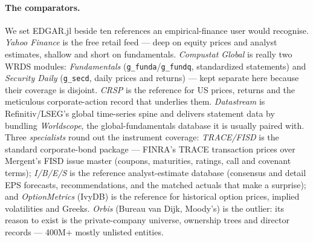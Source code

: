 \documentclass[11pt,a4paper]{report}
\begin{document}
\paragraph{The comparators.} We set EDGAR.jl beside ten references an empirical-finance user
would recognise. \emph{Yahoo Finance} is the free retail feed --- deep on equity prices and analyst
estimates, shallow and short on fundamentals. \emph{Compustat Global} is really two WRDS modules:
\emph{Fundamentals} (\texttt{g\_funda}/\texttt{g\_fundq}, standardized statements) and
\emph{Security Daily} (\texttt{g\_secd}, daily prices and returns) --- kept separate here because
their coverage is disjoint. \emph{CRSP} is the reference for US prices, returns and the meticulous
corporate-action record that underlies them. \emph{Datastream} is Refinitiv/LSEG's global
time-series spine and delivers statement data by bundling \emph{Worldscope}, the global-fundamentals
database it is usually paired with. Three \emph{specialists} round out the instrument coverage:
\emph{TRACE/FISD} is the standard corporate-bond package --- FINRA's TRACE transaction prices over
Mergent's FISD issue master (coupons, maturities, ratings, call and covenant terms); \emph{I/B/E/S}
is the reference analyst-estimate database (consensus and detail EPS forecasts, recommendations, and
the matched actuals that make a surprise); and \emph{OptionMetrics} (IvyDB) is the reference for
historical option prices, implied volatilities and Greeks. \emph{Orbis} (Bureau van Dijk, Moody's)
is the outlier: its reason to exist is the private-company universe, ownership trees and director
records --- 400M+ mostly unlisted entities.
\end{document}
